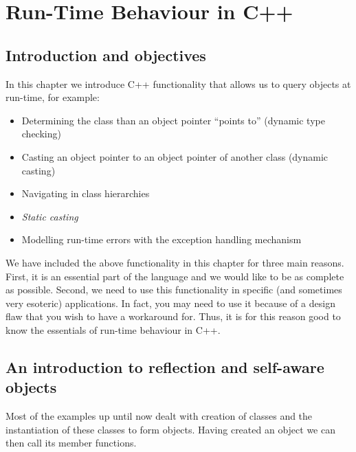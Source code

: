 \chapter{Run-Time Behaviour in C++}

\section{Introduction and objectives}

In this chapter we introduce C++ functionality that allows us to query objects at run-time, for example:
\begin{itemize}
	\item Determining the class than an object pointer ``points to'' (dynamic type checking)
	\item Casting an object pointer to an object pointer of another class (dynamic casting)
	\item Navigating in class hierarchies
	\item \emph{Static casting}
	\item Modelling run-time errors with the exception handling mechanism
\end{itemize}
We have included the above functionality in this chapter for three main reasons. First, it is an essential part of the language and we would like to be as complete as possible. Second, we need to use this functionality in specific (and sometimes very esoteric) applications. In fact, you may need to use it because of a design flaw that you wish to have a workaround for. Thus, it is for this reason good to know the essentials of run-time behaviour in C++.

\section{An introduction to reflection and self-aware objects}

Most of the examples up until now dealt with creation of classes and the instantiation of these classes to form objects. Having created an object we can then call its member functions.


